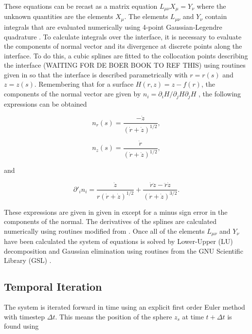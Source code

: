 \documentclass[12pt]{article}
\begin{document}
These equations can be recast as a matrix equation $L_{\mu\nu} X_{\mu} = Y_{\nu}$ where the unknown quantities are the elements $X_{\mu}$. The elements $L_{\mu\nu}$ and $Y_{\nu}$ contain integrals that are evaluated numerically using 4-point Gaussian-Legendre quadrature \citep{Riley06}. To calculate integrals over the interface, it is necessary to evaluate the components of normal vector and its divergence at discrete points along the interface. To do this, a cubic splines are fitted to the collocation points describing the interface (WAITING FOR DE BOER BOOK TO REF THIS) using routines given in \citet{Press07} so that the interface is described parametrically with $r = r(s)$ and $z = z(s)$. Remembering that for a surface $H(r,z) = z - f(r)$, the components of the normal vector are given by $n_{i} = \partial_{i} H / \partial_{j}H \partial_{j}H$ \citep{Riley06}, the following expressions can be obtained

\begin{equation}
\label{equ:norm_rad}
n_{r}(s) = \frac{-\dot{z}}{(\dot{r} + \dot{z})^{1/2}},
\end{equation}

\begin{equation}
\label{equ:norm_vert}
n_{z}(s) = \frac{\dot{r}}{(\dot{r} + \dot{z})^{1/2}},
\end{equation}

and 

\begin{equation}
\label{equ:div_norm}
\partial'_{i} n_{i} = \frac{\dot{z}}{r (\dot{r} + \dot{z})^{1/2}} + \frac{\dot{r} \ddot{z} - \ddot{r} \dot{z}}{(\dot{r} + \dot{z})^{3/2}}.
\end{equation}

These expressions are given in given in \citep{Manga94} except for a minus sign error in the components of the normal. The derivatives of the splines are calculated numerically using routines modified from \citet{Press07}. Once all of the elements $L_{\mu\nu}$ and $Y_{\nu}$ have been calculated the system of equations is solved by Lower-Upper (LU) decomposition and Gaussian elimination \citep{Riley06, Press07} using routines from the GNU Scientific Library (GSL) \citep{Galassi09}.

\subsection{Temporal Iteration}
\label{subsec:time}

The system is iterated forward in time using an explicit first order Euler method \citep{Manga94} with timestep $\Delta t$. This means the position of the sphere $z_{s}$ at time $t + \Delta t$ is found using 
\end{document}
